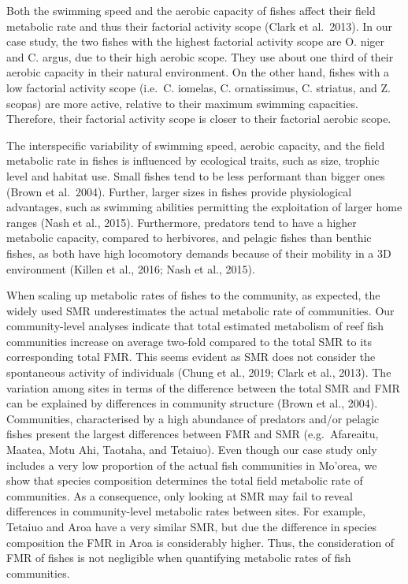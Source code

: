 \documentclass[12pt,a4paper]{article}
\begin{document}
\noindent Both the swimming speed and the aerobic capacity of fishes
affect their field metabolic rate and thus their factorial activity
scope (Clark et al.~2013). In our case study, the two fishes with the
highest factorial activity scope are O. niger and C. argus, due to their
high aerobic scope. They use about one third of their aerobic capacity
in their natural environment. On the other hand, fishes with a low
factorial activity scope (i.e.~C. iomelas, C. ornatissimus, C. striatus,
and Z. scopas) are more active, relative to their maximum swimming
capacities. Therefore, their factorial activity scope is closer to their
factorial aerobic scope.

\noindent The interspecific variability of swimming speed, aerobic
capacity, and the field metabolic rate in fishes is influenced by
ecological traits, such as size, trophic level and habitat use. Small
fishes tend to be less performant than bigger ones (Brown et al.~2004).
Further, larger sizes in fishes provide physiological advantages, such
as swimming abilities permitting the exploitation of larger home ranges
(Nash et al., 2015). Furthermore, predators tend to have a higher
metabolic capacity, compared to herbivores, and pelagic fishes than
benthic fishes, as both have high locomotory demands because of their
mobility in a 3D environment (Killen et al., 2016; Nash et al., 2015).

\noindent When scaling up metabolic rates of fishes to the community, as
expected, the widely used SMR underestimates the actual metabolic rate
of communities. Our community-level analyses indicate that total
estimated metabolism of reef fish communities increase on average
two-fold compared to the total SMR to its corresponding total FMR. This
seems evident as SMR does not consider the spontaneous activity of
individuals (Chung et al., 2019; Clark et al., 2013). The variation
among sites in terms of the difference between the total SMR and FMR can
be explained by differences in community structure (Brown et al., 2004).
Communities, characterised by a high abundance of predators and/or
pelagic fishes present the largest differences between FMR and SMR
(e.g.~Afareaitu, Maatea, Motu Ahi, Taotaha, and Tetaiuo). Even though
our case study only includes a very low proportion of the actual fish
communities in Mo'orea, we show that species composition determines the
total field metabolic rate of communities. As a consequence, only
looking at SMR may fail to reveal differences in community-level
metabolic rates between sites. For example, Tetaiuo and Aroa have a very
similar SMR, but due the difference in species composition the FMR in
Aroa is considerably higher. Thus, the consideration of FMR of fishes is
not negligible when quantifying metabolic rates of fish communities.
\end{document}
